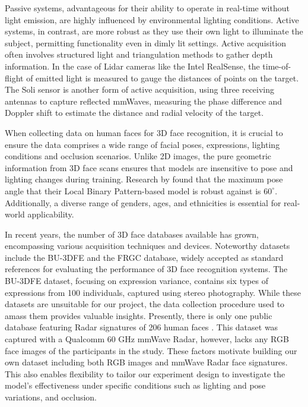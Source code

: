 \documentclass{interim}
\begin{document}
Passive systems, advantageous for their ability to operate in real-time without light emission, are highly influenced by environmental lighting conditions. Active systems, in contrast, are more robust as they use their own light to illuminate the subject, permitting functionality even in dimly lit settings. Active acquisition often involves structured light and triangulation methods to gather depth information. In the case of Lidar cameras like the Intel RealSense, the time-of-flight of emitted light is measured to gauge the distances of points on the target. The Soli sensor is another form of active acquisition, using three receiving antennas to capture reflected mmWaves, measuring the phase difference and Doppler shift to estimate the distance and radial velocity of the target. 

When collecting data on human faces for 3D face recognition, it is crucial to ensure the data comprises a wide range of facial poses, expressions, lighting conditions and occlusion scenarios. Unlike 2D images, the pure geometric information from 3D face scans ensures that models are insensitive to pose and lighting changes during training. Research by \cite{prabhu2011unconstrained} found that the maximum pose angle that their Local Binary Pattern-based model is robust against is $60^\circ$. Additionally, a diverse range of genders, ages, and ethnicities is essential for real-world applicability.

In recent years, the number of 3D face databases available has grown, encompassing various acquisition techniques and devices. Noteworthy datasets include the BU-3DFE \cite{yin20063d} and the FRGC \cite{phillips2005overview} database, widely accepted as standard references for evaluating the performance of 3D face recognition systems. The BU-3DFE dataset, focusing on expression variance, contains six types of expressions from 100 individuals, captured using stereo photography. While these datasets are unsuitable for our project, the data collection procedure used to amass them provides valuable insights. Presently, there is only one public database featuring Radar signatures of 206 human faces \cite{mmwavefacedata}. This dataset was captured with a Qualcomm 60 GHz mmWave Radar, however, lacks any RGB face images of the participants in the study. These factors motivate building our own dataset including both RGB images and mmWave Radar face signatures. This also enables flexibility to tailor our experiment design to investigate the model's effectiveness under specific conditions such as lighting and pose variations, and occlusion.
\end{document}
